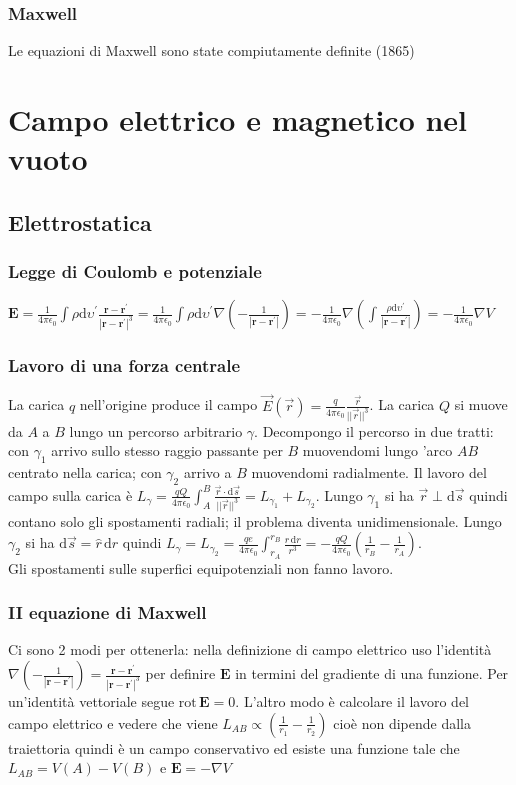 \documentclass[11pt,a4paper]{article}
\newcommand{\de}{\mathrm d}
\newcommand{\rot}[1]{\text{rot}\,#1}
\begin{document}
\subsubsection{Maxwell}
Le equazioni di Maxwell sono state compiutamente definite (1865)

	\section{Campo elettrico e magnetico nel vuoto}
\subsection{Elettrostatica}
\subsubsection{Legge di Coulomb e potenziale}
$\mathbf E = \frac1{4\pi\epsilon_0} \int \rho \de\upsilon^\prime \frac{\mathbf r - \mathbf r^\prime}{|\mathbf r - \mathbf r^\prime|^3} = \frac1{4\pi\epsilon_0} \int \rho \de\upsilon^\prime \nabla(-\frac1 {|\mathbf r-\mathbf r^\prime|}) = - \frac1{4\pi\epsilon_0} \nabla (\int \frac{\rho \de\upsilon^\prime}{|\mathbf r-\mathbf r^\prime|}) = - \frac1{4\pi\epsilon_0} \nabla V$

\subsubsection{Lavoro di una forza centrale}
La carica $q$ nell'origine produce il campo $\vec E(\vec r) = \frac{q}{4\pi\epsilon_0}\frac{\vec r}{||\vec r||^3}$. La carica $Q$ si muove da $A$ a $B$ lungo un percorso arbitrario $\gamma$. Decompongo il percorso in due tratti: con $\gamma_1$ arrivo sullo stesso raggio passante per $B$ muovendomi lungo 'arco $AB$ centrato nella carica; con $\gamma_2$ arrivo a $B$ muovendomi radialmente. Il lavoro del campo sulla carica è $ L_\gamma = \frac{qQ}{4\pi\epsilon_0}\int_A^B \frac{\vec r \cdot \de\vec s}{||\vec r||^3} =  L_{\gamma_1} +  L_{\gamma_2}$. Lungo $\gamma_1$ si ha $\vec r \perp \de\vec s$ quindi contano solo gli spostamenti radiali; il problema diventa unidimensionale. Lungo $\gamma_2$ si ha $\de\vec s = \hat r\,\de r$ quindi $ L_\gamma =  L_{\gamma_2} = \frac{qe}{4\pi\epsilon_0}\int_{r_A}^{r_B} \frac{r\,\de r}{r^3} = -\frac{qQ}{4\pi\epsilon_0}(\frac1{r_B}-\frac1{r_A})$.\\
Gli spostamenti sulle superfici equipotenziali non fanno lavoro.

\subsubsection{II equazione di Maxwell}
Ci sono 2 modi per ottenerla: nella definizione di campo elettrico uso l'identità $\nabla(-\frac1{|\mathbf r-\mathbf r^\prime|}) = \frac{\mathbf r-\mathbf r^\prime}{|\mathbf r-\mathbf r^\prime|^3}$ per definire $\mathbf E$ in termini del gradiente di una funzione. Per un'identità vettoriale segue $\rot\mathbf E= 0$. L'altro modo è calcolare il lavoro del campo elettrico e vedere che viene $L_{AB} \propto (\frac1{r_1} - \frac1{r_2})$ cioè non dipende dalla traiettoria quindi è un campo conservativo ed esiste una funzione tale che $L_{AB} = V(A) - V(B)$ e $\mathbf E = -\nabla V$
\end{document}
